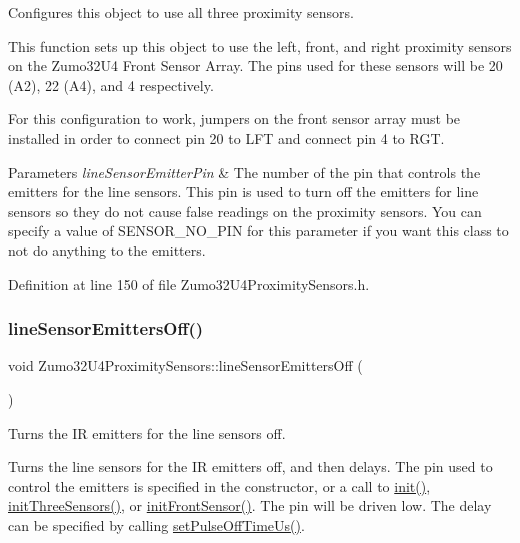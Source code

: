 Configures this object to use all three proximity sensors. 

This function sets up this object to use the left, front, and right proximity sensors on the Zumo32\+U4 Front Sensor Array. The pins used for these sensors will be 20 (A2), 22 (A4), and 4 respectively.

For this configuration to work, jumpers on the front sensor array must be installed in order to connect pin 20 to L\+FT and connect pin 4 to R\+GT.


\begin{DoxyParams}{Parameters}
{\em line\+Sensor\+Emitter\+Pin} & The number of the pin that controls the emitters for the line sensors. This pin is used to turn off the emitters for line sensors so they do not cause false readings on the proximity sensors. You can specify a value of S\+E\+N\+S\+O\+R\+\_\+\+N\+O\+\_\+\+P\+IN for this parameter if you want this class to not do anything to the emitters. \\
\hline
\end{DoxyParams}


Definition at line 150 of file Zumo32\+U4\+Proximity\+Sensors.\+h.

\mbox{\label{class_zumo32_u4_proximity_sensors_a583dada6ad676cbda2ec7d55b05338b8}} 
\subsubsection{\texorpdfstring{line\+Sensor\+Emitters\+Off()}{lineSensorEmittersOff()}}
{\footnotesize\ttfamily void Zumo32\+U4\+Proximity\+Sensors\+::line\+Sensor\+Emitters\+Off (\begin{DoxyParamCaption}{ }\end{DoxyParamCaption})}



Turns the IR emitters for the line sensors off. 

Turns the line sensors for the IR emitters off, and then delays. The pin used to control the emitters is specified in the constructor, or a call to \hyperlink{class_zumo32_u4_proximity_sensors_a250ef26e66807bc800adc42be912fab5}{init()}, \hyperlink{class_zumo32_u4_proximity_sensors_a521c7fe0992317c0566ff59ec132b469}{init\+Three\+Sensors()}, or \hyperlink{class_zumo32_u4_proximity_sensors_abcc9c393f47cf994f06d9cae51369a6a}{init\+Front\+Sensor()}. The pin will be driven low. The delay can be specified by calling \hyperlink{class_zumo32_u4_proximity_sensors_a4d7911aca58734a76be212de103a1387}{set\+Pulse\+Off\+Time\+Us()}. 

